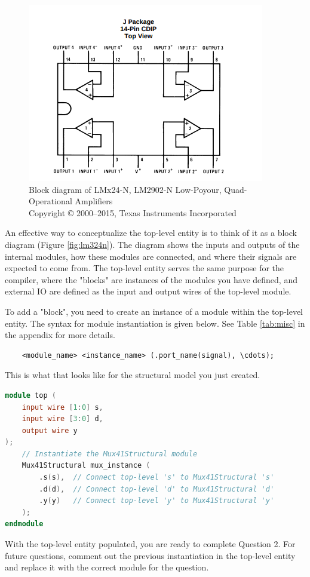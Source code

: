 \documentclass[12pt]{labmanual}
\begin{document}
\begin{figure}
    \centering
    \includegraphics[width=0.5\linewidth]{image_2024-09-26_224700848.png}
    \caption{Block diagram of LMx24-N, LM2902-N Low-Poyour, Quad-Operational Amplifiers \\
    \tiny{Copyright © 2000–2015, Texas Instruments Incorporated}}
    \label{fig:lm324n}
\end{figure}

An effective way to conceptualize the top-level entity is to think of it as a block diagram (Figure \vref{fig:lm324n}). The diagram shows the inputs and outputs of the internal modules, how these modules are connected, and where their signals are expected to come from. The top-level entity serves the same purpose for the compiler, where the "blocks" are instances of the modules you have defined, and external IO are defined as the input and output wires of the top-level module.

To add a "block", you need to create an instance of a module within the top-level entity. The syntax for module instantiation is given below. See Table \vref{tab:misc} in the appendix for more details.
\begin{lstlisting}
    <module_name> <instance_name> (.port_name(signal), \cdots);
\end{lstlisting}
This is what that looks like for the structural model you just created.

\begin{lstlisting}[language=verilog]
module top (
    input wire [1:0] s,
    input wire [3:0] d,
    output wire y
);
    // Instantiate the Mux41Structural module
    Mux41Structural mux_instance (
        .s(s),  // Connect top-level 's' to Mux41Structural 's'
        .d(d),  // Connect top-level 'd' to Mux41Structural 'd'
        .y(y)   // Connect top-level 'y' to Mux41Structural 'y'
    );
endmodule
\end{lstlisting}

With the top-level entity populated, you are ready to complete Question 2. For future questions, comment out the previous instantiation in the top-level entity and replace it with the correct module for the question.
\end{document}
